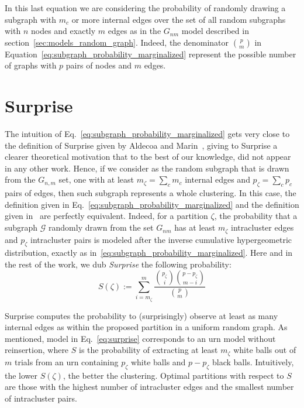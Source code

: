In this last equation we are considering the probability of randomly drawing a subgraph with $m_c$ or more internal edges over the set of all random subgraphs with $n$ nodes and exactly $m$ edges as in the $G_{nm}$ model described in section~\ref{sec:models_random_graph}. Indeed, the denominator $\binom{p}{m}$ in Equation~\ref{eq:subgraph_probability_marginalized} represent the possible number of graphs with $p$ pairs of nodes and $m$ edges. 

\section{Surprise}
The intuition of Eq.~\ref{eq:subgraph_probability_marginalized} gets very close to the definition of Surprise given by Aldecoa and Marin~\cite{aldecoa2011}, giving to Surprise a clearer theoretical motivation that to the best of our knowledge, did not appear in any other work. Hence, if we consider as the random subgraph that is drawn from the $G_{n,m}$ set, one with at least $m_\zeta=\sum_c m_c$ internal edges and $p_\zeta=\sum_c p_c$ pairs of edges, then such subgraph represents a whole clustering. In this case, the definition given in Eq.~\ref{eq:subgraph_probability_marginalized} and the definition given in~\cite{aldecoa2011} are perfectly equivalent. Indeed, for a partition $\zeta$, the probability that a subgraph $\mathcal{G}$ randomly drawn from the set $G_{nm}$ has at least $m_\zeta$ intracluster edges and $p_\zeta$ intracluster pairs is modeled after the inverse cumulative hypergeometric distribution, exactly as in~\ref{eq:subgraph_probability_marginalized}.
Here and in the rest of the work, we dub \emph{Surprise} the following probability:
\begin{equation}\label{eq:surprise}
S(\zeta) := \sum_{i = m_\zeta}^m \dfrac{\binom{p_\zeta}{i} \binom{p-p_\zeta}{m-i} }{\binom{p}{m}}
\end{equation}

Surprise computes the probability to (surprisingly) observe at least as many internal edges as within the proposed partition in a uniform random graph.
As mentioned, model in Eq.~\ref{eq:surprise}  corresponds to an urn model without reinsertion, where $S$ is the probability of extracting at least $m_\zeta$ white balls out of $m$ trials from an urn containing $p_\zeta$ white balls and $p-p_\zeta$ black balls.
Intuitively, the lower $S(\zeta)$, the better the clustering. Optimal partitions with respect to $S$ are those with the highest number of intracluster edges and the smallest number of intracluster pairs. 

